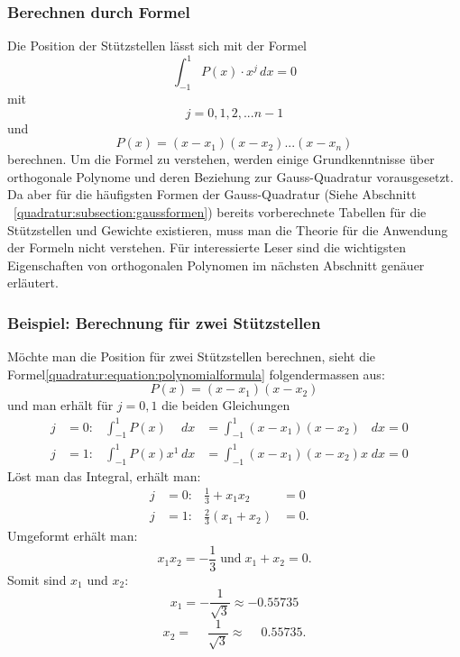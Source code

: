 \subsubsection{Berechnen durch Formel}
Die Position der Stützstellen lässt sich mit der Formel
\begin{equation*}
    \int_{-1}^{1} P(x) \cdot x^{j} \, dx = 0
\end{equation*}
mit
\begin{equation*}
    j = 0, 1, 2, ... n - 1
\end{equation*}
und 
\begin{equation} \label{quadratur:equation:polynomialformula}
    P(x) = (x - x_{1})(x - x_{2}) ... (x - x_{n})
\end{equation}
berechnen. Um die Formel zu verstehen, werden einige Grundkenntnisse über 
orthogonale Polynome und deren Beziehung zur Gauss-Quadratur vorausgesetzt.
Da aber für die häufigsten Formen der Gauss-Quadratur 
(Siehe Abschnitt ~\ref{quadratur:subsection:gaussformen}) bereits vorberechnete
Tabellen für die Stützstellen und Gewichte existieren, muss man die Theorie
für die Anwendung der Formeln nicht verstehen. Für interessierte Leser sind 
die wichtigsten Eigenschaften von orthogonalen Polynomen im nächsten 
Abschnitt genäuer erläutert.

\subsubsection{Beispiel: Berechnung für zwei Stützstellen}
Möchte man die Position für zwei Stützstellen berechnen, 
sieht die Formel\ref{quadratur:equation:polynomialformula} folgendermassen aus:
\begin{equation}
    P(x) = (x - x_{1})(x - x_{2})
\end{equation}
und man erhält für $j = 0,1$ die beiden Gleichungen
\begin{align}
    j &= 0: & \int_{-1}^{1}P(x)\phantom{x^{1}}\,dx  &= \int_{-1}^{1}(x - x_{1})(x - x_{2})\phantom{x} \; dx = 0 & \\
    j &= 1: & \int_{-1}^{1}P(x)x^{1}\,dx            &= \int_{-1}^{1}(x - x_{1})(x - x_{2})x \; dx = 0 &
\end{align}
Löst man das Integral, erhält man:
\begin{align}
    j  &= 0: & \frac{1}{3} + x_{1}x_{2} &= 0 & \\
    j  &= 1: & \frac{2}{3}(x_{1}+x_{2}) &= 0. &
\end{align}
Umgeformt erhält man:
\begin{equation}
    x_{1}x_{2} = -\frac{1}{3}
    \;
    \text{und}
    \;
    x_{1}+x_{2} = 0.
\end{equation}
Somit sind $ x_{1} $ und $ x_{2} $:
\begin{equation*}
    x_{1} = -\frac{1}{\sqrt{3}} \approx -0.55735
\end{equation*}
\begin{equation}
    x_{2} = \phantom{-} \frac{1}{\sqrt{3}} \approx \phantom{-}0.55735.
\end{equation}

